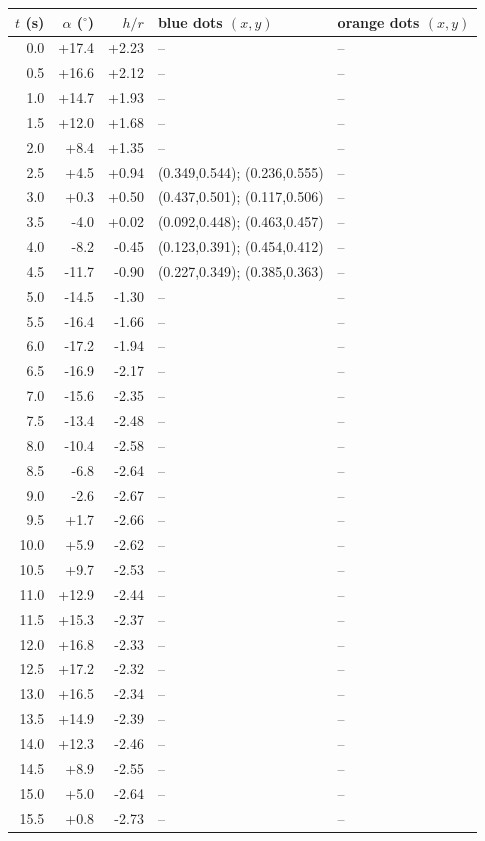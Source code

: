 \documentclass[10pt,a4paper]{article}
\begin{document}
\begin{longtable}{@{}rrrp{55mm}p{55mm}@{}}
\toprule
$t$ (s) & $\alpha$ ($^\circ$) & $h/r$ & blue dots $(x,y)$ & orange dots $(x,y)$\\\midrule\endhead
0.0 & +17.4 & +2.23 & -- & --\\
0.5 & +16.6 & +2.12 & -- & --\\
1.0 & +14.7 & +1.93 & -- & --\\
1.5 & +12.0 & +1.68 & -- & --\\
2.0 & +8.4 & +1.35 & -- & --\\
2.5 & +4.5 & +0.94 & (0.349,0.544); (0.236,0.555) & --\\
3.0 & +0.3 & +0.50 & (0.437,0.501); (0.117,0.506) & --\\
3.5 & -4.0 & +0.02 & (0.092,0.448); (0.463,0.457) & --\\
4.0 & -8.2 & -0.45 & (0.123,0.391); (0.454,0.412) & --\\
4.5 & -11.7 & -0.90 & (0.227,0.349); (0.385,0.363) & --\\
5.0 & -14.5 & -1.30 & -- & --\\
5.5 & -16.4 & -1.66 & -- & --\\
6.0 & -17.2 & -1.94 & -- & --\\
6.5 & -16.9 & -2.17 & -- & --\\
7.0 & -15.6 & -2.35 & -- & --\\
7.5 & -13.4 & -2.48 & -- & --\\
8.0 & -10.4 & -2.58 & -- & --\\
8.5 & -6.8 & -2.64 & -- & --\\
9.0 & -2.6 & -2.67 & -- & --\\
9.5 & +1.7 & -2.66 & -- & --\\
10.0 & +5.9 & -2.62 & -- & --\\
10.5 & +9.7 & -2.53 & -- & --\\
11.0 & +12.9 & -2.44 & -- & --\\
11.5 & +15.3 & -2.37 & -- & --\\
12.0 & +16.8 & -2.33 & -- & --\\
12.5 & +17.2 & -2.32 & -- & --\\
13.0 & +16.5 & -2.34 & -- & --\\
13.5 & +14.9 & -2.39 & -- & --\\
14.0 & +12.3 & -2.46 & -- & --\\
14.5 & +8.9 & -2.55 & -- & --\\
15.0 & +5.0 & -2.64 & -- & --\\
15.5 & +0.8 & -2.73 & -- & --\\

\end{longtable}
\end{document}
